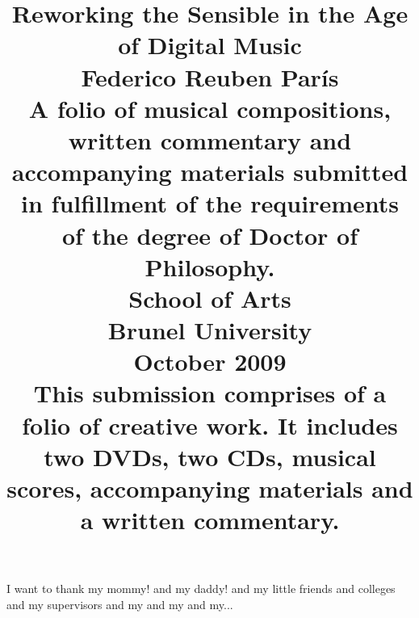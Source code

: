 \documentclass[oneside,11pt]{report}
\title{\huge Reworking the Sensible in the Age of Digital Music \vspace{70pt} \\ \Large Federico Reuben Par\'{i}s \vspace{20pt} \\ \large A folio of musical compositions, written commentary and accompanying materials submitted \vspace{-5pt} \\ in fulfillment of the requirements of the degree of Doctor of Philosophy. \vspace{30pt} \\ School of Arts \vspace{30pt} \\ Brunel University \vspace{30pt} \\ October 2009 \vspace{90pt} \\ \normalsize This submission comprises of a folio of creative work. It includes two DVDs, two CDs, musical \vspace{-5pt} \\ scores, accompanying materials and a written commentary.}
\date{}
\begin{document}
\maketitle

I want to thank my mommy! and my daddy! and my little friends and colleges and my supervisors and my and my and my...


\tableofcontents
\listoffigures














\end{document}
